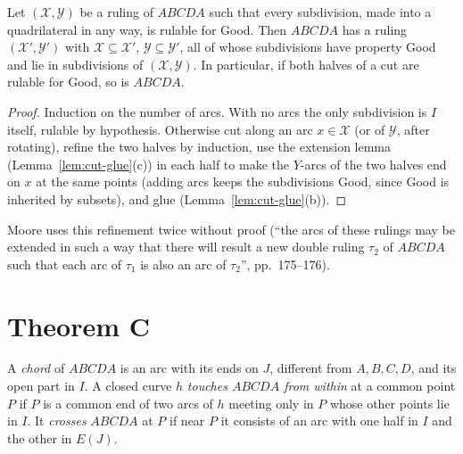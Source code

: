 \begin{proposition}[Refinement]\label{prop:refine}
Let $(\mathcal X,\mathcal Y)$ be a ruling of $ABCDA$ such that every subdivision, made into a quadrilateral in any way, is rulable for
Good. Then $ABCDA$ has a ruling $(\mathcal X',\mathcal Y')$ with $\mathcal X\subseteq\mathcal X'$, $\mathcal Y\subseteq\mathcal Y'$, all of whose
subdivisions have property Good and lie in subdivisions of $(\mathcal X,\mathcal Y)$. In particular, if both halves of a cut are rulable for
Good, so is $ABCDA$.
\end{proposition}

\begin{proof}
Induction on the number of arcs. With no arcs the only subdivision is $I$ itself, rulable by hypothesis. Otherwise cut along an arc
$x\in\mathcal X$ (or of $\mathcal Y$, after rotating), refine the two halves by induction, use the extension lemma
(Lemma~\ref{lem:cut-glue}(c)) in each half to make the $Y$-arcs of the two halves end on $x$ at the same points (adding arcs keeps the
subdivisions Good, since Good is inherited by subsets), and glue (Lemma~\ref{lem:cut-glue}(b)).
\end{proof}


Moore uses this refinement twice without proof (``the arcs of these rulings may be extended in such a way that there will result a new
double ruling $\tau_2$ of $ABCDA$ such that each arc of $\tau_1$ is also an arc of $\tau_2$'', pp.~175--176).

\section{Theorem C}

\begin{definition}\label{def:chord-quad}
A \emph{chord} of $ABCDA$ is an arc with its ends on $J$, different from $A,B,C,D$, and its open part in $I$. A closed curve $h$
\emph{touches $ABCDA$ from within} at a common point $P$ if $P$ is a common end of two arcs of $h$ meeting only in $P$ whose other
points lie in $I$. It \emph{crosses} $ABCDA$ at $P$ if near $P$ it consists of an arc with one half in $I$ and the other in $E(J)$.
\end{definition}


